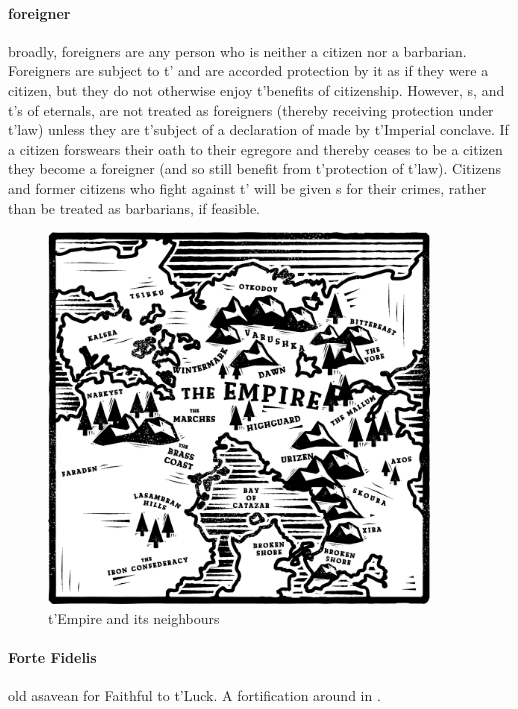 \paragraph{foreigner} broadly, foreigners are any person who is neither a citizen nor a barbarian. Foreigners are subject to t'\allowbreak {} and are accorded protection by it as if they were a citizen, but they do not otherwise enjoy t'\allowbreak benefits of citizenship. However, s, and t'\allowbreak {}s of eternals, are not treated as foreigners (thereby receiving protection under t'\allowbreak law) unless they are t'\allowbreak subject of a declaration of  made by t'\allowbreak Imperial conclave. If a citizen forswears their oath to their egregore and thereby ceases to be a citizen they become a foreigner (and so still benefit from t'\allowbreak protection of t'\allowbreak law). Citizens and former citizens who fight against t'\allowbreak {} will be given s for their crimes, rather than be treated as barbarians, if feasible. \begin{figure}\centering\includegraphics[width=0.9\textwidth]{encyclopedia/worldmap}\caption{t'Empire and its neighbours}\end{figure}
\paragraph{Forte Fidelis} old asavean for Faithful to t'\allowbreak Luck. A fortification around  in .
